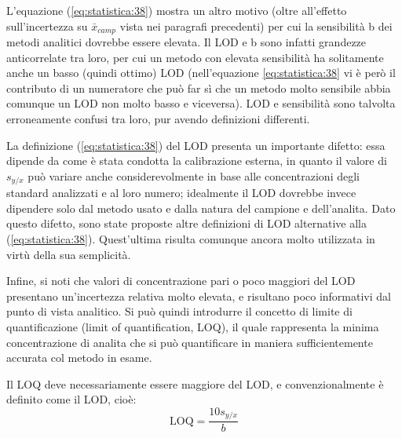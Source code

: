 L'equazione (\ref{eq:statistica:38}) mostra un altro motivo (oltre all'effetto sull'incertezza su $\bar{x}_{camp}$ vista nei paragrafi precedenti) per cui la sensibilità b dei metodi analitici dovrebbe essere elevata. Il LOD e b sono infatti grandezze anticorrelate tra loro, per cui un metodo con elevata sensibilità ha solitamente anche un basso (quindi ottimo) LOD (nell'equazione \ref{eq:statistica:38} vi è però il contributo di un numeratore che può far sì che un metodo molto sensibile abbia comunque un LOD non molto basso e viceversa). LOD e sensibilità sono talvolta erroneamente confusi tra loro, pur avendo definizioni differenti.

La definizione (\ref{eq:statistica:38}) del LOD presenta un importante difetto: essa dipende da come è stata condotta la calibrazione esterna, in quanto il valore di $s_{y/x}$ può variare anche considerevolmente in base alle concentrazioni degli standard analizzati e al loro numero; idealmente il LOD dovrebbe invece dipendere solo dal metodo usato e dalla natura del campione e dell'analita. Dato questo difetto, sono state proposte altre definizioni di LOD alternative alla (\ref{eq:statistica:38}). Quest'ultima risulta comunque ancora molto utilizzata in virtù della sua semplicità.

Infine, si noti che valori di concentrazione pari o poco maggiori del LOD presentano un'incertezza relativa molto elevata, e risultano poco informativi dal punto di vista analitico. Si può quindi introdurre il concetto di limite di quantificazione (limit of quantification, LOQ), il quale rappresenta la minima concentrazione di analita che si può quantificare in maniera sufficientemente accurata col metodo in esame. 

Il LOQ deve necessariamente essere maggiore del LOD, e convenzionalmente è definito come  il LOD, cioè:
\begin{equation} \label{eq:statistica:40}
\mathrm{LOQ} = \frac{10 s_{y/x}}{b}
\end{equation}





